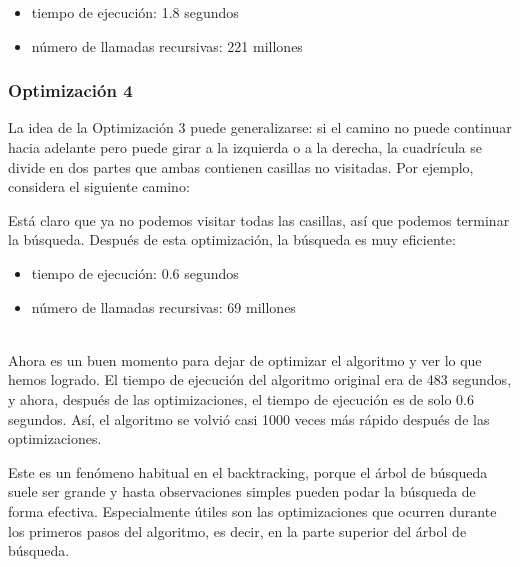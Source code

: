 \begin{itemize}
\item
tiempo de ejecución: 1.8 segundos
\item
número de llamadas recursivas: 221 millones
\end{itemize}

\subsubsection{Optimización 4}

La idea de la Optimización 3
puede generalizarse:
si el camino no puede continuar hacia adelante
pero puede girar a la izquierda o a la derecha,
la cuadrícula se divide en dos partes
que ambas contienen casillas no visitadas.
Por ejemplo, considera el siguiente camino:

\begin{center}
\end{center}
Está claro que ya no podemos visitar todas las casillas,
así que podemos terminar la búsqueda.
Después de esta optimización, la búsqueda es
muy eficiente:

\begin{itemize}
\item
tiempo de ejecución: 0.6 segundos
\item
número de llamadas recursivas: 69 millones
\end{itemize}

~\\
Ahora es un buen momento para dejar de optimizar
el algoritmo y ver lo que hemos logrado.
El tiempo de ejecución del algoritmo original
era de 483 segundos,
y ahora, después de las optimizaciones,
el tiempo de ejecución es de solo 0.6 segundos.
Así, el algoritmo se volvió casi 1000 veces
más rápido después de las optimizaciones.

Este es un fenómeno habitual en el backtracking,
porque el árbol de búsqueda suele ser grande
y hasta observaciones simples pueden podar
la búsqueda de forma efectiva.
Especialmente útiles son las optimizaciones que
ocurren durante los primeros pasos del algoritmo,
es decir, en la parte superior del árbol de búsqueda.


